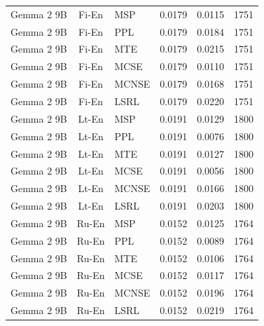 \begin{table}
\begin{tabular}{lc}
Gemma 2 9B & Fi-En & MSP & 0.0179 & 0.0115 & 1751 \\
Gemma 2 9B & Fi-En & PPL & 0.0179 & 0.0184 & 1751 \\
Gemma 2 9B & Fi-En & MTE & 0.0179 & 0.0215 & 1751 \\
Gemma 2 9B & Fi-En & MCSE & 0.0179 & 0.0110 & 1751 \\
Gemma 2 9B & Fi-En & MCNSE & 0.0179 & 0.0168 & 1751 \\
Gemma 2 9B & Fi-En & LSRL & 0.0179 & 0.0220 & 1751 \\
Gemma 2 9B & Lt-En & MSP & 0.0191 & 0.0129 & 1800 \\
Gemma 2 9B & Lt-En & PPL & 0.0191 & 0.0076 & 1800 \\
Gemma 2 9B & Lt-En & MTE & 0.0191 & 0.0127 & 1800 \\
Gemma 2 9B & Lt-En & MCSE & 0.0191 & 0.0056 & 1800 \\
Gemma 2 9B & Lt-En & MCNSE & 0.0191 & 0.0166 & 1800 \\
Gemma 2 9B & Lt-En & LSRL & 0.0191 & 0.0203 & 1800 \\
Gemma 2 9B & Ru-En & MSP & 0.0152 & 0.0125 & 1764 \\
Gemma 2 9B & Ru-En & PPL & 0.0152 & 0.0089 & 1764 \\
Gemma 2 9B & Ru-En & MTE & 0.0152 & 0.0106 & 1764 \\
Gemma 2 9B & Ru-En & MCSE & 0.0152 & 0.0117 & 1764 \\
Gemma 2 9B & Ru-En & MCNSE & 0.0152 & 0.0196 & 1764 \\
Gemma 2 9B & Ru-En & LSRL & 0.0152 & 0.0219 & 1764 \\
\midrule
\end{tabular}
\end{table}
